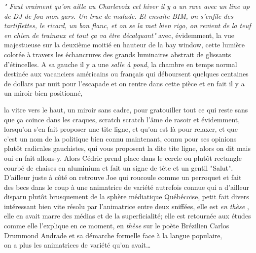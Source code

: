\begin{paracol}{2}

\phantom
\small
\textit{"\textelp{} Faut vraiment qu'on aille au Charlevoix cet hiver
il y a un rave avec un line up de DJ de fou mon gars. Un truc de malade. 
Et ensuite BIM, on s'enfile des tartiflettes, le ricard, un bon flanc, 
et on se la met bien rigo, on revient de la teuf en chien de trainaux
et tout ça va être décalquant"}
\switchcolumn
{}
avec, évidemment, la vue majestueuse sur la deuxième moitié en hauteur de la bay
window, cette lumière colorée à travers les échancrures des grands luminaires
abstrait de glissants d'étincelles.  
A sa gauche il y a une \emph{salle à poud}, la chambre en temps normal 
destinée aux vacanciers
américains ou français qui déboursent quelques centaines de dollars par nuit
pour l'escapade et on rentre dans cette pièce
et en fait il y a un miroir bien positionné,\end{paracol}
la vitre vers le haut, un miroir
sans cadre, pour gratouiller tout ce qui reste sans que ça coince dans les
craques, scratch scratch l'âme de rasoir et évidemment, lorsqu'on s'en fait
proposer une tite ligne, et qu'on est là pour relaxer, et que c'est un nom de
la politique bien connu maintenant, connu pour ses opinions plutôt radicales
gauchistes, qui vous proposent la dite tite ligne, alors on dit mais oui en fait
allons-y. Alors Cédric prend place dans le cercle ou plutôt rectangle courbé
de chaises en aluminium et fait un signe de tête et un gentil "Salut". 
D'ailleur juste à côté on retrouve Joe qui roucoule comme un
perroquet et fait des becs dans le coup à une animatrice
de variété autrefois connue qui a d'ailleur disparu plutôt brusquement de la
sphère médiatique Québécoise, petit fait divers intéressant bien vite résolu par
l'animatrice entre deux sniffées, elle est \emph{en thèse} , elle en avait marre
des médias et de la superficialité; elle est retournée aux études comme elle
l'explique en ce moment, en \emph{thèse} sur le poète Brézilien Carlos Drummond
Andrade et sa démarche formelle face à la langue populaire, \\ on a plus les
animatrices de variété qu'on avait\ldots

